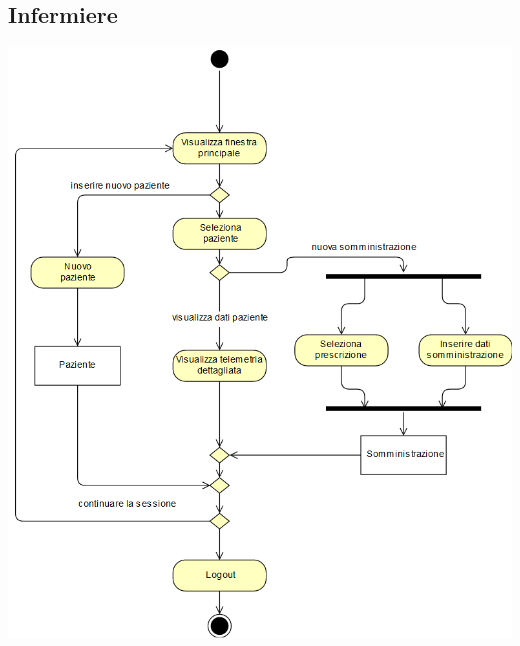 \documentclass[a4paper]{report}
\begin{document}
        \subsection*{Infermiere}
        \begin{center}
                    \includegraphics[scale=0.5]{activity/InfermiereActivity.png}
        \end{center}
\end{document}
